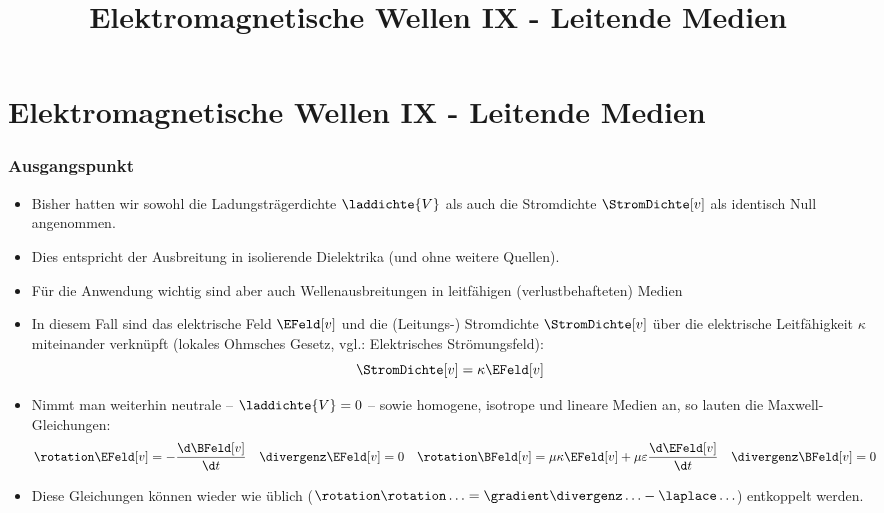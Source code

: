 
  
\title[TET: Elektromagnetische Wellen IX - Leitende Medien]{Elektromagnetische Wellen IX - Leitende Medien}


% 
% 

\maketitle

% 
% 
\section{Elektromagnetische Wellen IX - Leitende Medien}

\begin{frame}
  \frametitle{Ausgangspunkt}
  \begin{itemize}[<+->]
  \item Bisher hatten wir sowohl die Ladungsträgerdichte \(\laddichte{V}\) als auch die Stromdichte \(\StromDichte[v]\) als identisch Null angenommen.
  \item Dies entspricht der \alert{Ausbreitung in isolierende Dielektrika} (und ohne weitere Quellen).
  \item Für die \alert{Anwendung wichtig} sind aber auch \alert{Wellenausbreitungen in leitfähigen (verlustbehafteten) Medien}
  \item In diesem Fall sind das elektrische Feld \(\EFeld[v]\) und die (Leitungs-) Stromdichte \(\StromDichte[v]\) über die elektrische Leitfähigkeit \(\kappa\) miteinander verknüpft (\alert{lokales Ohmsches Gesetz}, vgl.: Elektrisches Strömungsfeld):
    \begin{equation*}
      \StromDichte[v] = \kappa \EFeld[v]
    \end{equation*}
  \item Nimmt man weiterhin neutrale -- \(\laddichte{V} = 0\) -- sowie homogene, isotrope und lineare Medien an, so lauten die Maxwell-Gleichungen:
    \begin{align*}
      \rotation \EFeld[v] &= -\frac{\d \BFeld[v]}{\d t} & \divergenz \EFeld[v] &= 0 & \rotation \BFeld[v] &= \mu\kappa \EFeld[v] + \mu\varepsilon \frac{\d \EFeld[v]}{\d t} & \divergenz\BFeld[v] &= 0
    \end{align*}
    \item Diese Gleichungen können wieder wie üblich (\(\rotation\rotation\ldots = \gradient\divergenz\ldots - \laplace\ldots\)) entkoppelt werden.
    \end{itemize}
    \ 
  \end{frame}

